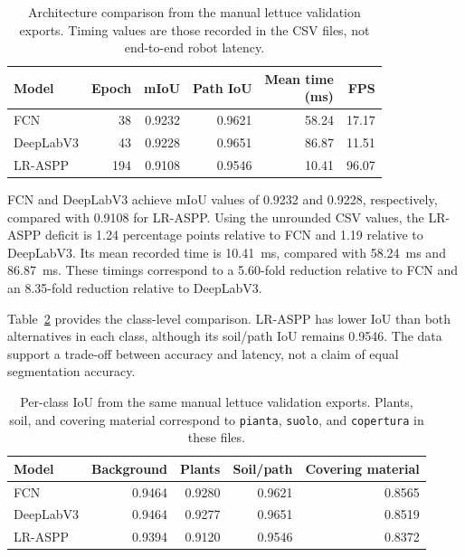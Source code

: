 \begin{table}[htbp]
    \centering
    \small
    \caption{Architecture comparison from the manual lettuce validation
    exports. Timing values are those recorded in the CSV files, not
    end-to-end robot latency.}
    \label{tab:c3_architecture_results}
    \begin{tabular}{@{}l r r r r r@{}}
        \toprule
        Model & Epoch & mIoU & Path IoU &
        \shortstack{Mean time\\(ms)} & FPS \\
        \midrule
        FCN & 38 & 0.9232 & 0.9621 & 58.24 & 17.17 \\
        DeepLabV3 & 43 & 0.9228 & 0.9651 & 86.87 & 11.51 \\
        LR-ASPP & 194 & 0.9108 & 0.9546 & 10.41 & 96.07 \\
        \bottomrule
    \end{tabular}
\end{table}

FCN and DeepLabV3 achieve mIoU values of 0.9232 and 0.9228, respectively,
compared with 0.9108 for LR-ASPP. Using the unrounded CSV values, the
LR-ASPP deficit is 1.24 percentage points relative to FCN and 1.19
relative to DeepLabV3. Its mean recorded time is 10.41~ms, compared
with 58.24~ms and 86.87~ms. These timings correspond to a 5.60-fold
reduction relative to FCN and an 8.35-fold reduction relative to
DeepLabV3.

Table~\ref{tab:c3_architecture_class_iou} provides the class-level
comparison. LR-ASPP has lower IoU than both alternatives in each class,
although its soil/path IoU remains 0.9546. The data support a trade-off
between accuracy and latency, not a claim of equal segmentation accuracy.

\begin{table}[htbp]
    \centering
    \small
    \caption{Per-class IoU from the same manual lettuce validation
    exports. Plants, soil, and covering material correspond to
    \texttt{pianta}, \texttt{suolo}, and \texttt{copertura} in these files.}
    \label{tab:c3_architecture_class_iou}
    \begin{tabular}{@{}l r r r r@{}}
        \toprule
        Model & Background & Plants & Soil/path & Covering material \\
        \midrule
        FCN & 0.9464 & 0.9280 & 0.9621 & 0.8565 \\
        DeepLabV3 & 0.9464 & 0.9277 & 0.9651 & 0.8519 \\
        LR-ASPP & 0.9394 & 0.9120 & 0.9546 & 0.8372 \\
        \bottomrule
    \end{tabular}
\end{table}


